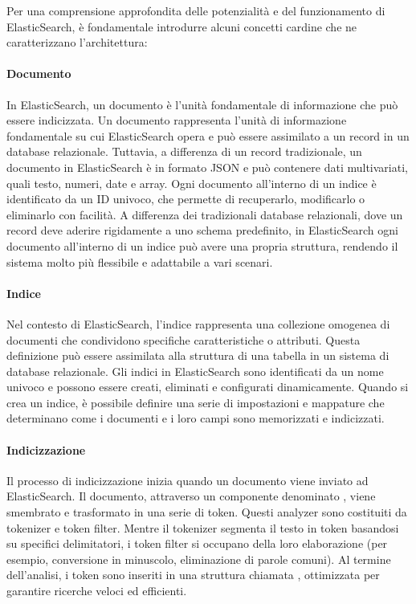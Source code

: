 Per una comprensione approfondita delle potenzialità e del funzionamento di ElasticSearch, è fondamentale introdurre alcuni concetti cardine che ne caratterizzano l'architettura:

\paragraph{Documento}
In ElasticSearch, un documento è l'unità fondamentale di informazione che può essere indicizzata. Un documento rappresenta l'unità di informazione fondamentale su cui ElasticSearch opera e può essere assimilato a un record in un database relazionale. Tuttavia, a differenza di un record tradizionale, un documento in ElasticSearch è in formato JSON e può contenere dati multivariati, quali testo, numeri, date e array. Ogni documento all'interno di un indice è identificato da un ID univoco, che permette di recuperarlo, modificarlo o eliminarlo con facilità. A differenza dei tradizionali database relazionali, dove un record deve aderire rigidamente a uno schema predefinito, in ElasticSearch ogni documento all'interno di un indice può avere una propria struttura, rendendo il sistema molto più flessibile e adattabile a vari scenari.


\paragraph{Indice}
Nel contesto di ElasticSearch, l'indice rappresenta una collezione omogenea di documenti che condividono specifiche caratteristiche o attributi. Questa definizione può essere assimilata alla struttura di una tabella in un sistema di database relazionale. Gli indici in ElasticSearch sono identificati da un nome univoco e possono essere creati, eliminati e configurati dinamicamente. Quando si crea un indice, è possibile definire una serie di impostazioni e mappature che determinano come i documenti e i loro campi sono memorizzati e indicizzati.


\paragraph{Indicizzazione}
Il processo di indicizzazione inizia quando un documento viene inviato ad ElasticSearch. Il documento, attraverso un componente denominato , viene smembrato e trasformato in una serie di token. Questi analyzer sono costituiti da tokenizer e token filter. Mentre il tokenizer segmenta il testo in token basandosi su specifici delimitatori, i token filter si occupano della loro elaborazione (per esempio, conversione in minuscolo, eliminazione di parole comuni). Al termine dell'analisi, i token sono inseriti in una struttura chiamata , ottimizzata per garantire ricerche veloci ed efficienti.

